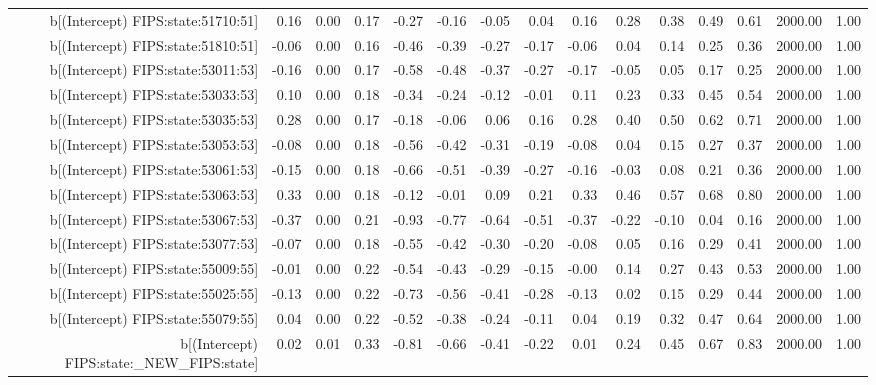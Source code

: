 \begin{table}[ht]
\begin{tabular}{rrrrrrrrrrrrrrr}
  b[(Intercept) FIPS:state:51710:51] & 0.16 & 0.00 & 0.17 & -0.27 & -0.16 & -0.05 & 0.04 & 0.16 & 0.28 & 0.38 & 0.49 & 0.61 & 2000.00 & 1.00 \\ 
  b[(Intercept) FIPS:state:51810:51] & -0.06 & 0.00 & 0.16 & -0.46 & -0.39 & -0.27 & -0.17 & -0.06 & 0.04 & 0.14 & 0.25 & 0.36 & 2000.00 & 1.00 \\ 
  b[(Intercept) FIPS:state:53011:53] & -0.16 & 0.00 & 0.17 & -0.58 & -0.48 & -0.37 & -0.27 & -0.17 & -0.05 & 0.05 & 0.17 & 0.25 & 2000.00 & 1.00 \\ 
  b[(Intercept) FIPS:state:53033:53] & 0.10 & 0.00 & 0.18 & -0.34 & -0.24 & -0.12 & -0.01 & 0.11 & 0.23 & 0.33 & 0.45 & 0.54 & 2000.00 & 1.00 \\ 
  b[(Intercept) FIPS:state:53035:53] & 0.28 & 0.00 & 0.17 & -0.18 & -0.06 & 0.06 & 0.16 & 0.28 & 0.40 & 0.50 & 0.62 & 0.71 & 2000.00 & 1.00 \\ 
  b[(Intercept) FIPS:state:53053:53] & -0.08 & 0.00 & 0.18 & -0.56 & -0.42 & -0.31 & -0.19 & -0.08 & 0.04 & 0.15 & 0.27 & 0.37 & 2000.00 & 1.00 \\ 
  b[(Intercept) FIPS:state:53061:53] & -0.15 & 0.00 & 0.18 & -0.66 & -0.51 & -0.39 & -0.27 & -0.16 & -0.03 & 0.08 & 0.21 & 0.36 & 2000.00 & 1.00 \\ 
  b[(Intercept) FIPS:state:53063:53] & 0.33 & 0.00 & 0.18 & -0.12 & -0.01 & 0.09 & 0.21 & 0.33 & 0.46 & 0.57 & 0.68 & 0.80 & 2000.00 & 1.00 \\ 
  b[(Intercept) FIPS:state:53067:53] & -0.37 & 0.00 & 0.21 & -0.93 & -0.77 & -0.64 & -0.51 & -0.37 & -0.22 & -0.10 & 0.04 & 0.16 & 2000.00 & 1.00 \\ 
  b[(Intercept) FIPS:state:53077:53] & -0.07 & 0.00 & 0.18 & -0.55 & -0.42 & -0.30 & -0.20 & -0.08 & 0.05 & 0.16 & 0.29 & 0.41 & 2000.00 & 1.00 \\ 
  b[(Intercept) FIPS:state:55009:55] & -0.01 & 0.00 & 0.22 & -0.54 & -0.43 & -0.29 & -0.15 & -0.00 & 0.14 & 0.27 & 0.43 & 0.53 & 2000.00 & 1.00 \\ 
  b[(Intercept) FIPS:state:55025:55] & -0.13 & 0.00 & 0.22 & -0.73 & -0.56 & -0.41 & -0.28 & -0.13 & 0.02 & 0.15 & 0.29 & 0.44 & 2000.00 & 1.00 \\ 
  b[(Intercept) FIPS:state:55079:55] & 0.04 & 0.00 & 0.22 & -0.52 & -0.38 & -0.24 & -0.11 & 0.04 & 0.19 & 0.32 & 0.47 & 0.64 & 2000.00 & 1.00 \\ 
  b[(Intercept) FIPS:state:\_NEW\_FIPS:state] & 0.02 & 0.01 & 0.33 & -0.81 & -0.66 & -0.41 & -0.22 & 0.01 & 0.24 & 0.45 & 0.67 & 0.83 & 2000.00 & 1.00 \\ 

\end{tabular}
\end{table}
